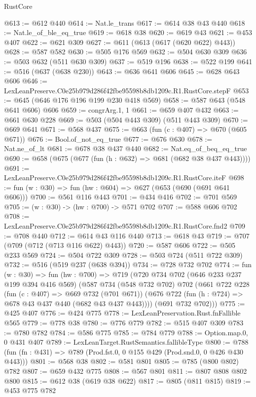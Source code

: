 \begin{lexlean}{RustCore}
\begin{coremodule}
@613 := @612 @440
@614 := Nat.le_trans
@617 := @614 @38 @43 @440
@618 := Nat.le_of_ble_eq_true
@619 := @618 @38
@620 := @619 @43
@621 := @453 @407
@622 := @621 @309
@627 := @611 (@613 (@617 (@620 @622) @443))
@628 := @587 @582
@630 := @505 @176 @569
@632 := @504 @630 @309
@636 := @503 @632 (@511 @630 @309)
@637 := @519 @196
@638 := @522 @199
@641 := @516 (@637 (@638 @230))
@643 := @636 @641 @606
@645 := @628 @643 @606
@646 := LexLeanPreserve.C0e25b979d286f42fbe95598b8db1209c.R1.RustCore.stepF
@653 := @645 (@646 @176 @196 @199 @230 @418 @569)
@658 := @587 @643 (@548 @641 @606) @606
@659 := congrArg.{1, 1}
@661 := @659 @407 @432
@663 := @661 @630 @228
@669 := @503 (@504 @443 @309) (@511 @443 @309)
@670 := @669 @641
@671 := @568 @437
@675 := @663 (fun (c : @407) => @670 (@605 @671))
@676 := Bool.of_not_eq_true
@677 := @676 @630
@678 := Nat.ne_of_lt
@681 := @678 @38 @437 @440
@682 := Nat.eq_of_beq_eq_true
@690 := @658 (@675 (@677 (fun (h : @632) => @681 (@682 @38 @437 @443))))
@691 := LexLeanPreserve.C0e25b979d286f42fbe95598b8db1209c.R1.RustCore.iteF
@698 := fun (w : @30) => fun (hw : @604) => @627 (@653 (@690 (@691 @641 @606)))
@700 := @561 @116 @443
@701 := @434 @416
@702 := @701 @569
@705 := (w : @30) -> (hw : @700) -> @571 @702
@707 := @588 @606 @702
@708 := LexLeanPreserve.C0e25b979d286f42fbe95598b8db1209c.R1.RustCore.fnd2
@709 := @708 @440
@712 := @614 @43 @116 @440
@713 := @618 @43
@719 := @707 (@709 (@712 (@713 @116 @622) @443))
@720 := @587 @606
@722 := @505 @233 @569
@724 := @504 @722 @309
@728 := @503 @724 (@511 @722 @309)
@732 := @516 (@519 @237 (@638 @394))
@734 := @728 @732 @702
@774 := fun (w : @30) =>
  fun (hw : @700) =>
  @719
    (@720
      @734
      @702
      (@646 @233 @237 @199 @394 @416 @569)
      (@587
        @734
        (@548 @732 @702)
        @702
        (@661
          @722
          @228
          (fun (c : @407) => @669 @732 (@701 @671))
          (@676 @722 (fun (h : @724) => @678 @43 @437 @440 (@682 @43 @437 @443))))
        (@691 @732 @702)))
@775 := @425 @407
@776 := @424 @775
@778 := LexLeanPreservation.Rust.fnFallible @565
@779 := @778 @38
@780 := @776 @779
@782 := @515 @407 @309
@783 := @780 @782
@784 := @586 @775
@785 := @784 @779
@788 := Option.map.{0, 0} @431 @407
@789 := LexLeanTarget.RustSemantics.fallibleType
@800 := @788 (fun (fn : @431) => @789 (Prod.fst.{0, 0} @155 @429 (Prod.snd.{0, 0} @426 @430 @443)))
@801 := @568 @38
@802 := @581 @801
@805 := @785 (@800 @802) @782
@807 := @659 @432 @775
@808 := @567 @801
@811 := @807 @808 @802 @800
@815 := @612 @38 (@619 @38 @622)
@817 := @805 (@811 @815)
@819 := @453 @775 @782

\end{coremodule}
\end{lexlean}
